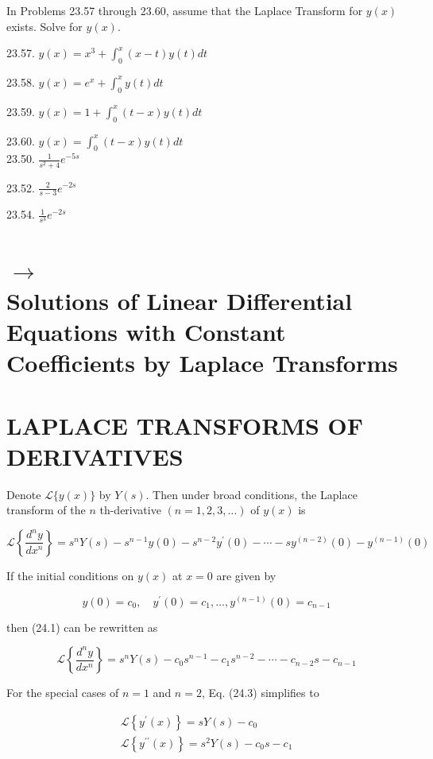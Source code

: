 \documentclass[10pt]{article}
\begin{document}
In Problems 23.57 through 23.60, assume that the Laplace Transform for $y(x)$ exists. Solve for $y(x)$.

23.57. $y(x)=x^{3}+\int_{0}^{x}(x-t) y(t) d t$

23.58. $y(x)=e^{x}+\int_{0}^{x} y(t) d t$

23.59. $y(x)=1+\int_{0}^{x}(t-x) y(t) d t$

23.60. $y(x)=\int_{0}^{x}(t-x) y(t) d t$\\
23.50. $\frac{1}{s^{2}+4} e^{-5 s}$

23.52. $\frac{2}{s-3} e^{-2 s}$

23.54. $\frac{1}{s^{3}} e^{-2 s}$

\section*{$\rightarrow$ \\
 Solutions of Linear Differential Equations with Constant Coefficients by Laplace Transforms}
\section*{LAPLACE TRANSFORMS OF DERIVATIVES}
Denote $\mathscr{L}\{y(x)\}$ by $Y(s)$. Then under broad conditions, the Laplace transform of the $n$ th-derivative $(n=1,2,3, \ldots)$ of $y(x)$ is


\begin{equation*}
\mathscr{L}\left\{\frac{d^{n} y}{d x^{n}}\right\}=s^{n} Y(s)-s^{n-1} y(0)-s^{n-2} y^{\prime}(0)-\cdots-s y^{(n-2)}(0)-y^{(n-1)}(0) \tag{24.1}
\end{equation*}


If the initial conditions on $y(x)$ at $x=0$ are given by


\begin{equation*}
y(0)=c_{0}, \quad y^{\prime}(0)=c_{1}, \ldots, y^{(n-1)}(0)=c_{n-1} \tag{24.2}
\end{equation*}


then (24.1) can be rewritten as


\begin{equation*}
\mathscr{L}\left\{\frac{d^{n} y}{d x^{n}}\right\}=s^{n} Y(s)-c_{0} s^{n-1}-c_{1} s^{n-2}-\cdots-c_{n-2} s-c_{n-1} \tag{24.3}
\end{equation*}


For the special cases of $n=1$ and $n=2$, Eq. (24.3) simplifies to


\begin{gather*}
\mathscr{L}\left\{y^{\prime}(x)\right\}=s Y(s)-c_{0}  \tag{24.4}\\
\mathscr{L}\left\{y^{\prime \prime}(x)\right\}=s^{2} Y(s)-c_{0} s-c_{1} \tag{24.5}
\end{gather*}
\end{document}
